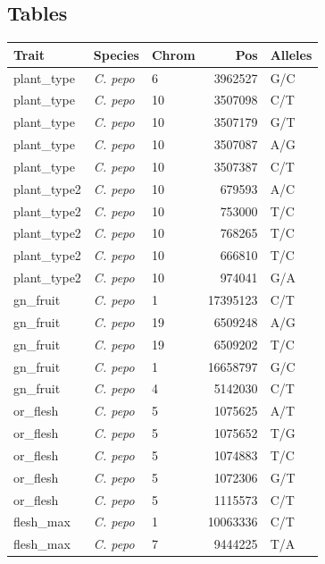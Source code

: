 \documentclass[utf8]{frontiers_suppmat} %
\begin{document}
\subsection{Tables}
\begin{table}[ht]
	\centering
	\begin{tabular}{lllrl}
		\hline
		{\bfseries Trait} & {\bfseries Species} & {\bfseries Chrom} & {\bfseries Pos} & {\bfseries Alleles} \\ 
		\hline
		plant\_type & \textit{C. pepo} & 6 & 3962527 & G/C \\ 
		plant\_type & \textit{C. pepo} & 10 & 3507098 & C/T \\ 
		plant\_type & \textit{C. pepo} & 10 & 3507179 & G/T \\ 
		plant\_type & \textit{C. pepo} & 10 & 3507087 & A/G \\ 
		plant\_type & \textit{C. pepo} & 10 & 3507387 & C/T \\ 
		plant\_type2 & \textit{C. pepo} & 10 & 679593 & A/C \\ 
		plant\_type2 & \textit{C. pepo} & 10 & 753000 & T/C \\ 
		plant\_type2 & \textit{C. pepo} & 10 & 768265 & T/C \\ 
		plant\_type2 & \textit{C. pepo} & 10 & 666810 & T/C \\ 
		plant\_type2 & \textit{C. pepo} & 10 & 974041 & G/A \\ 
		gn\_fruit & \textit{C. pepo} & 1 & 17395123 & C/T \\ 
		gn\_fruit & \textit{C. pepo} & 19 & 6509248 & A/G \\ 
		gn\_fruit & \textit{C. pepo} & 19 & 6509202 & T/C \\ 
		gn\_fruit & \textit{C. pepo} & 1 & 16658797 & G/C \\ 
		gn\_fruit & \textit{C. pepo} & 4 & 5142030 & C/T \\ 
		or\_flesh & \textit{C. pepo} & 5 & 1075625 & A/T \\ 
		or\_flesh & \textit{C. pepo} & 5 & 1075652 & T/G \\ 
		or\_flesh & \textit{C. pepo} & 5 & 1074883 & T/C \\ 
		or\_flesh & \textit{C. pepo} & 5 & 1072306 & G/T \\ 
		or\_flesh & \textit{C. pepo} & 5 & 1115573 & C/T \\ 
		flesh\_max & \textit{C. pepo} & 1 & 10063336 & C/T \\ 
		flesh\_max & \textit{C. pepo} & 7 & 9444225 & T/A \\ 

\end{tabular}
\end{table}
\end{document}
